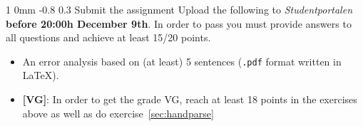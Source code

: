 \documentclass[10.9pt]{article}
\makeatletter
\newcommand{\newsec}[2]{\section{#1}\label{sec:#2}\noindent}
\renewcommand{\section}{\@startsection
{section}%
{1}%
{0mm}%
{-0.8\baselineskip}%
{0.3\baselineskip}%
{\bfseries\large}}%
\makeatother
\begin{document}
\newsec{Submit the assignment}{sub}%
Upload the following to {\it Studentportalen} \textbf{before 20:00h
  December 9th}. In order to pass you must provide answers to all
questions and achieve at least 15/20 points.
\begin{itemize}[noitemsep,topsep=0.2cm]
\item An error analysis based on (at least) 5 sentences (\texttt{.pdf}
  format written in \LaTeX).
\item \textbf{[VG]}: In order to get the grade VG, reach at least 18
    points in the exercises above as well as do exercise~\ref{sec:handparse}
\end{itemize}
\end{document}
